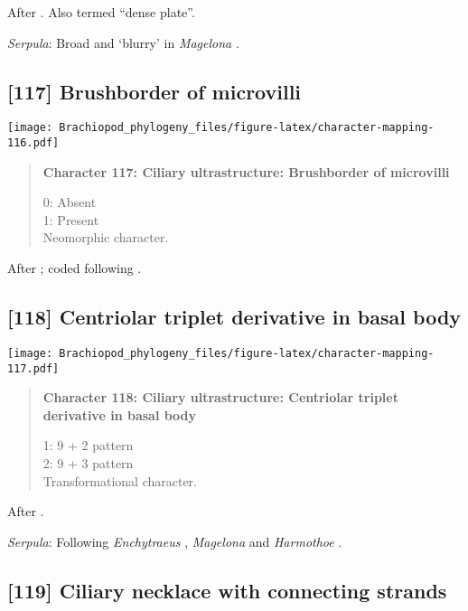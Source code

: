 \documentclass[openany]{book}
\theoremstyle{definition}
\theoremstyle{definition}
\theoremstyle{definition}
\theoremstyle{remark}
\begin{document}
After \citet{Lundin2009}. Also termed ``dense plate''.

\hypertarget{Serpula-coding-116}{}
\emph{Serpula}: Broad and `blurry' in \emph{Magelona}
\citep{Bartolomaeus1995}.

\subsection*{{[}117{]} Brushborder of
microvilli}\label{brushborder-of-microvilli}

\texttt{[image: Brachiopod\_phylogeny\_files/figure-latex/character-mapping-116.pdf]}

\begin{quote}
\textbf{Character 117: Ciliary ultrastructure: Brushborder of
microvilli}

0: Absent\\
1: Present\\
Neomorphic character.
\end{quote}

After \citet{Lundin2009}; coded following \citet{Smith2012}.

\subsection*{{[}118{]} Centriolar triplet derivative in basal
body}\label{centriolar-triplet-derivative-in-basal-body}

\texttt{[image: Brachiopod\_phylogeny\_files/figure-latex/character-mapping-117.pdf]}

\begin{quote}
\textbf{Character 118: Ciliary ultrastructure: Centriolar triplet
derivative in basal body}

1: 9 + 2 pattern\\
2: 9 + 3 pattern\\
Transformational character.
\end{quote}

After \citet{Lundin2009}.

\hypertarget{Serpula-coding-118}{}
\emph{Serpula}: Following \emph{Enchytraeus} \citep{Reger1967},
\emph{Magelona} \citep{Bartolomaeus1995} and \emph{Harmothoe}
\citep{Holborow1969}.

\subsection*{{[}119{]} Ciliary necklace with connecting
strands}\label{ciliary-necklace-with-connecting-strands}
\end{document}
